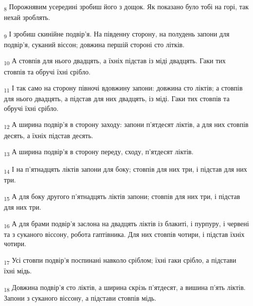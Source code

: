 \begin{tcolorbox}
\textsubscript{8} Порожнявим усередині зробиш його з дощок. Як показано було тобі на горі, так нехай зроблять.
\end{tcolorbox}
\begin{tcolorbox}
\textsubscript{9} І зробиш скинійне подвір'я. На південну сторону, на полудень запони для подвір'я, суканий віссон; довжина першій стороні сто літків.
\end{tcolorbox}
\begin{tcolorbox}
\textsubscript{10} А стовпів для нього двадцять, а їхніх підстав із міді двадцять. Гаки тих стовпів та обручі їхні срібло.
\end{tcolorbox}
\begin{tcolorbox}
\textsubscript{11} І так само на сторону півночі вдовжину запони: довжина сто ліктів; а стовпів для нього двадцять, а підстав для них двадцять, із міді. Гаки тих стовпів та обручі їхні срібло.
\end{tcolorbox}
\begin{tcolorbox}
\textsubscript{12} А ширина подвір'я в сторону заходу: запони п'ятдесят ліктів, а для них стовпів десять, а їхніх підстав десять.
\end{tcolorbox}
\begin{tcolorbox}
\textsubscript{13} А ширина подвір'я в сторону переду, сходу, п'ятдесят ліктів.
\end{tcolorbox}
\begin{tcolorbox}
\textsubscript{14} І на п'ятнадцять ліктів запони для боку; стовпів для них три, і підстав для них три.
\end{tcolorbox}
\begin{tcolorbox}
\textsubscript{15} А для боку другого п'ятнадцять ліктів запони; стовпів для них три, і підстав для них три.
\end{tcolorbox}
\begin{tcolorbox}
\textsubscript{16} А для брами подвір'я заслона на двадцять ліктів із блакиті, і пурпуру, і червені та з суканого віссону, робота гаптівника. Для них стовпів чотири, і підстав їхніх чотири.
\end{tcolorbox}
\begin{tcolorbox}
\textsubscript{17} Усі стовпи подвір'я поспинані навколо сріблом; їхні гаки срібло, а підстави їхні мідь.
\end{tcolorbox}
\begin{tcolorbox}
\textsubscript{18} Довжина подвір'я сто ліктів, а ширина скрізь п'ятдесят, а вишина п'ять ліктів. Запони з суканого віссону, а підстави стовпів мідь.
\end{tcolorbox}
